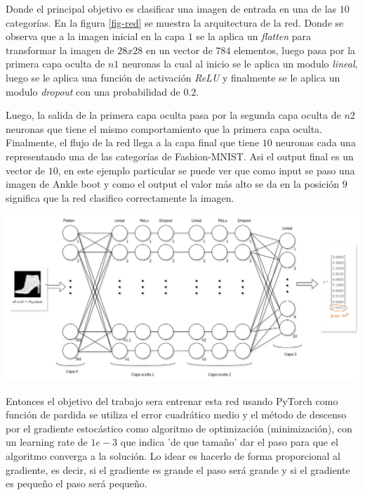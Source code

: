 \documentclass[aps,prl,reprint,groupedaddress]{revtex4-2}
\newenvironment{Figura}
  {\par\medskip\noindent\minipage{\linewidth}}
  {\endminipage\par\medskip}
\begin{document}
Donde el principal objetivo es clasificar una imagen de entrada en una de las 
$10$ categorías. En la figura \ref{fig-red} se muestra la arquitectura de la red.
Donde se observa que a la imagen inicial en la capa $1$ se la aplica un 
\textit{flatten} para transformar la imagen de $28x28$ en un vector de $784$ 
elementos, luego pasa por la primera capa oculta de $n1$ neuronas la cual al 
inicio se le aplica un modulo \textit{lineal}, luego se le aplica una función 
de activación \textit{ReLU} y finalmente se le aplica un modulo \textit{dropout} 
con una probabilidad de $0.2$.

Luego, la salida de la primera capa oculta pasa por la segunda capa oculta de $n2$
neuronas que tiene el mismo comportamiento que la primera capa oculta. Finalmente,
el flujo de la red llega a la capa final que tiene $10$ neuronas cada una 
representando una de las categorías de Fashion-MNIST. Asi el output final es un 
vector de $10$, en este ejemplo particular se puede ver que como input se paso 
una imagen de Ankle boot y como el output el valor más alto se da en la posición
$9$ significa que la red clasifico correctamente la imagen.

\begin{Figura}
  \centering
  \includegraphics[width=1\textwidth]{figs/arq_model.png}
  \label{fig-red}
\end{Figura}

Entonces el objetivo del trabajo sera entrenar esta red usando PyTorch como 
función de pardida se utiliza el error cuadrático medio y el método de descenso 
por el gradiente estocástico como algoritmo de optimización (minimización), 
con un learning rate de $1e-3$ que indica 'de que tamaño' dar el paso 
para que el algoritmo converga a la solución. Lo idear es hacerlo de forma 
proporcional al gradiente, es decir, si el gradiente es grande el paso será
grande y si el gradiente es pequeño el paso será pequeño.
\end{document}
